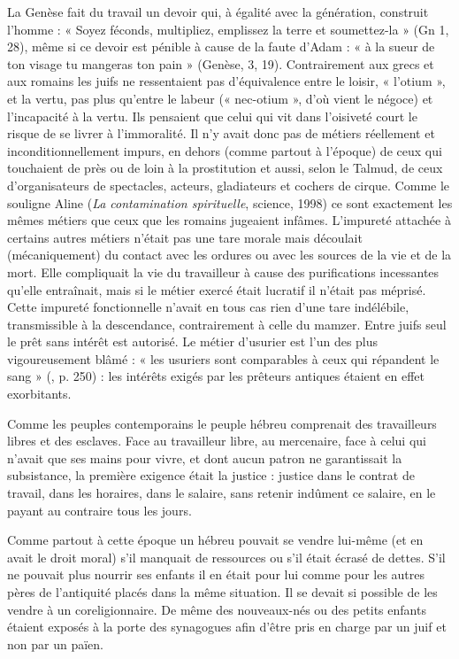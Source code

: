  La Genèse fait du travail un devoir qui, à égalité avec la génération, construit l'homme : « Soyez féconds, multipliez, emplissez la terre et soumettez-la » (Gn 1, 28), même si ce devoir est pénible à cause de la faute d'Adam : « à la sueur de ton visage tu mangeras ton pain » (Genèse, 3, 19). Contrairement aux grecs et aux romains les juifs ne ressentaient pas d'équivalence entre le loisir, « l'otium », et la vertu, pas plus qu'entre le labeur (« nec-otium », d'où vient le négoce) et l'incapacité à la vertu. Ils pensaient que celui qui vit dans l'oisiveté court le risque de se livrer à l'immoralité. Il n'y avait donc pas de métiers réellement et inconditionnellement impurs, en dehors (comme partout à l'époque) de ceux qui touchaient de près ou de loin à la prostitution et aussi, selon le Talmud, de ceux d'organisateurs de spectacles, acteurs, gladiateurs et cochers de cirque. Comme le souligne Aline  (\emph{La contamination spirituelle}, science, 1998) ce sont exactement les mêmes métiers que ceux que les romains jugeaient infâmes. L'impureté attachée à certains autres métiers n'était pas une tare morale mais découlait (mécaniquement) du contact avec les ordures ou avec les sources de la vie et de la mort. Elle compliquait la vie du travailleur à cause des purifications incessantes qu'elle entraînait, mais si le métier exercé était lucratif il n'était pas méprisé. Cette impureté fonctionnelle n'avait en tous cas rien d'une tare indélébile, transmissible à la descendance, contrairement à celle du mamzer. Entre juifs seul le prêt sans intérêt est autorisé. Le métier d'usurier est l'un des plus vigoureusement blâmé : « les usuriers sont comparables à ceux qui répandent le sang » (, p. 250) : les intérêts exigés par les prêteurs antiques étaient en effet exorbitants. 

 Comme les peuples contemporains le peuple hébreu comprenait des travailleurs libres et des esclaves. Face au travailleur libre, au mercenaire, face à celui qui n'avait que ses mains pour vivre, et dont aucun patron ne garantissait la subsistance, la première exigence était la justice : justice dans le contrat de travail, dans les horaires, dans le salaire, sans retenir indûment ce salaire, en le payant au contraire tous les jours.

 Comme partout à cette époque un hébreu pouvait se vendre lui-même (et en avait le droit moral) s'il manquait de ressources ou s'il était écrasé de dettes. S'il ne pouvait plus nourrir ses enfants il en était pour lui comme pour les autres pères de l'antiquité placés dans la même situation. Il se devait si possible de les vendre à un coreligionnaire. De même des nouveaux-nés ou des petits enfants étaient exposés à la porte des synagogues afin d'être pris en charge par un juif et non par un païen. 

